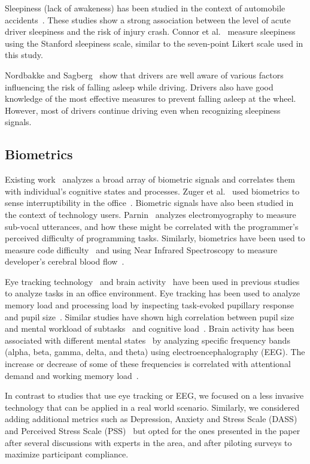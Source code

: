 Sleepiness (lack of awakeness) has been studied in the context of automobile 
accidents~\cite{connor02,Nordbakke07}.
These studies show a strong association between the level of acute driver sleepiness and the risk of injury crash.
Connor et al.~\cite{connor02} measure sleepiness using the Stanford sleepiness scale, similar to the seven-point Likert scale used in this study.

Nordbakke and Sagberg~\cite{Nordbakke07} show that drivers are well aware of  various factors influencing the risk of falling asleep while driving. Drivers also have good knowledge of the most effective measures to prevent falling asleep at the wheel.
However, most of drivers continue driving even when recognizing sleepiness signals.

\subsection{Biometrics}

Existing work~\cite{sano2013stress,healey2005detecting,wijsman2011towards,zuger2015interruptibility,goyal2017intelligent,Parnin2011,Nakagawa2014,Radevski2015} analyzes a broad array of biometric signals and correlates them with individual's cognitive states and processes.
Zuger et al.~\cite{zuger18} used biometrics to sense interruptibility in the office~\cite{zuger18}.
Biometric signals have also been studied in the context of technology users. Parnin~\cite{Parnin2011} analyzes electromyography to measure sub-vocal utterances, and how these might be correlated with the programmer's perceived difficulty of programming tasks. Similarly, biometrics have been used to measure code difficulty~\cite{fritz2014using}
and using Near Infrared Spectroscopy to measure developer's cerebral blood flow~\cite{Nakagawa2014}.

Eye tracking technology~\cite{Bednarik2006,Crosby1990,Rodeghero2014} and brain activity~\cite{Ikutani2014,Siegmund2014} 
have been used in previous studies to analyze tasks in an office environment.
Eye tracking has been used to analyze memory load and processing load by inspecting task-evoked pupillary response and pupil size~\cite{beatty82}. Similar studies have shown high correlation between pupil size and mental workload of subtasks~\cite{beatty82} and cognitive load~\cite{Klingner10}.
Brain activity has been associated with different mental states~\cite{Berger29} by analyzing specific frequency bands (alpha, beta, gamma, delta, and theta) using electroencephalography (EEG). The increase or decrease of some of these frequencies is correlated with
attentional demand and working memory load~\cite{Smith05,sterman93}.

In contrast to studies that use eye tracking or EEG, we focused on a less invasive technology that can be applied in a real world scenario.
Similarly, we considered adding additional metrics such as Depression, Anxiety and Stress Scale (DASS) and Perceived Stress Scale (PSS)~\cite{Ferdous15} but opted for the ones presented in the paper after several discussions with experts in the area, and after piloting surveys to maximize participant compliance.


